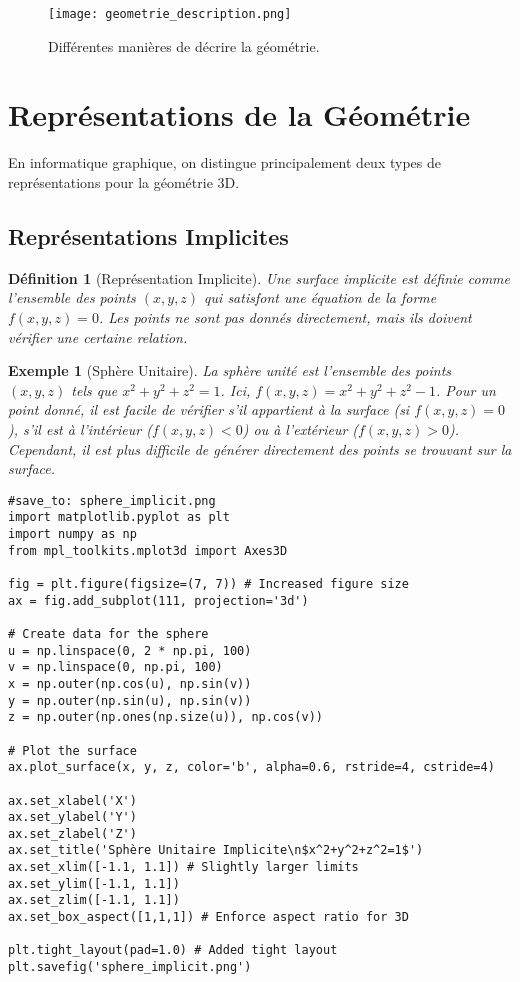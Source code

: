 \documentclass{article}
\newtheorem{definition}{Définition}
\newtheorem{example}{Exemple}
\begin{document}
\begin{figure}[H]
\centering
\texttt{[image: geometrie\_description.png]} %
\caption{Différentes manières de décrire la géométrie.}
\label{fig:geom_description}
\end{figure}

\section{Représentations de la Géométrie}

En informatique graphique, on distingue principalement deux types de représentations pour la géométrie 3D.

\subsection{Représentations Implicites}
\begin{definition}[Représentation Implicite]
Une surface implicite est définie comme l'ensemble des points $(x, y, z)$ qui satisfont une équation de la forme $f(x, y, z) = 0$. Les points ne sont pas donnés directement, mais ils doivent vérifier une certaine relation.
\end{definition}

\begin{example}[Sphère Unitaire]
La sphère unité est l'ensemble des points $(x, y, z)$ tels que $x^2 + y^2 + z^2 = 1$. Ici, $f(x, y, z) = x^2 + y^2 + z^2 - 1$. Pour un point donné, il est facile de vérifier s'il appartient à la surface (si $f(x,y,z)=0$), s'il est à l'intérieur ($f(x,y,z)<0$) ou à l'extérieur ($f(x,y,z)>0$). Cependant, il est plus difficile de générer directement des points se trouvant sur la surface.
\end{example}

\begin{verbatim}
#save_to: sphere_implicit.png
import matplotlib.pyplot as plt
import numpy as np
from mpl_toolkits.mplot3d import Axes3D

fig = plt.figure(figsize=(7, 7)) # Increased figure size
ax = fig.add_subplot(111, projection='3d')

# Create data for the sphere
u = np.linspace(0, 2 * np.pi, 100)
v = np.linspace(0, np.pi, 100)
x = np.outer(np.cos(u), np.sin(v))
y = np.outer(np.sin(u), np.sin(v))
z = np.outer(np.ones(np.size(u)), np.cos(v))

# Plot the surface
ax.plot_surface(x, y, z, color='b', alpha=0.6, rstride=4, cstride=4)

ax.set_xlabel('X')
ax.set_ylabel('Y')
ax.set_zlabel('Z')
ax.set_title('Sphère Unitaire Implicite\n$x^2+y^2+z^2=1$')
ax.set_xlim([-1.1, 1.1]) # Slightly larger limits
ax.set_ylim([-1.1, 1.1])
ax.set_zlim([-1.1, 1.1])
ax.set_box_aspect([1,1,1]) # Enforce aspect ratio for 3D

plt.tight_layout(pad=1.0) # Added tight layout
plt.savefig('sphere_implicit.png')
\end{verbatim}
\end{document}
